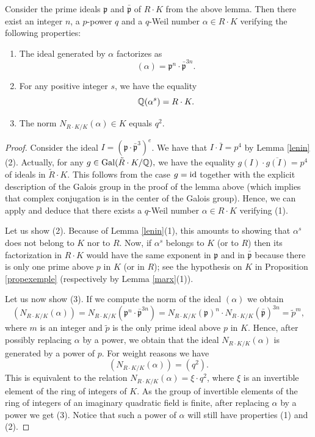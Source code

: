 \documentclass[11pt]{amsart}
\begin{document}
\begin{appendices}
\begin{lemma}\label{engels}
Consider the prime ideals $\mathfrak{p}$ and $\bar{\mathfrak{p}}$ of  $R\cdot K$ from the above lemma. Then there exist an integer $n$, a $p$-power $q$ and a $q$-Weil number $\alpha\in R\cdot K$ verifying the following properties:
\begin{enumerate}
 \item The ideal generated by $\alpha$ factorizes as
\[(\alpha)=\mathfrak{p}^n\cdot \bar{\mathfrak{p}}^{3n}.\]
\item For any positive integer $s$, we have the equality
\[\mathbb{Q}(\alpha^s)= R\cdot K.\]
\item The norm $N_{R\cdot K/K}(\alpha)\in K$ equals $q^2$.
\end{enumerate}
\end{lemma}
\begin{proof}
Consider the ideal $I=(\mathfrak{p}\cdot \bar{\mathfrak{p}}^{3})^e $. We have that $I \cdot \bar{I}= p^4$ by Lemma \ref{lenin}(2). Actually, for any $g\in\textnormal{Gal}(\tilde{R}\cdot K/\mathbb{Q}),$ we have the equality ${g(I) \cdot \overline{g(I)}= p^4}$ of ideals in $\tilde{R}\cdot K$. This follows from the case $g=\mathrm{id}$ together with the explicit description of the Galois group in the proof of the lemma above (which implies that complex conjugation is in the center of the Galois group). Hence, we can apply  \cite[Lemma 1]{Honda} and deduce that there exists a  $q$-Weil number $\alpha\in R\cdot K$ verifying (1).





Let us show (2). Because of Lemma \ref{lenin}(1), this amounts to showing that $\alpha^s$ does not belong to $K$ nor to $R$. Now, if  $\alpha^s$ belongs to $K$ (or to $R$) then its factorization in $R\cdot K$ would have the same exponent in $\mathfrak{p}$ and in $\bar{\mathfrak{p}}$ because there is only one prime above $p$ in $K$ (or in $R$); see the hypothesis on $K$ in Proposition \ref{propexemple} (respectively by Lemma \ref{marx}(1)).


Let us now show (3). If we compute the  norm of the ideal $(\alpha)$ we obtain
\[ (N_{R\cdot K/K} (\alpha))= N_{R\cdot K/K} (\mathfrak{p}^n\cdot \bar{\mathfrak{p}}^{3n}) = N_{R\cdot K/K} (\mathfrak{p})^n\cdot N_{R\cdot K/K} ( \bar{\mathfrak{p}})^{3n}= \tilde{p}^m,\]
where $m$ is an integer and $\tilde{p}$ is the only prime ideal above $p$ in $K$. Hence, after possibly replacing $\alpha$ by a power, we obtain that the ideal $N_{R\cdot K/K} (\alpha)$ is generated by a power of $p$. For weight reasons we have
\[(N_{R\cdot K/K} (\alpha)) = (q^2).\]
This is equivalent to the relation $N_{R\cdot K/K} (\alpha) = \xi \cdot q^2$, where $\xi$ is an invertible element of the ring of integers of $K$. As the group of  invertible elements of the ring of integers of an  imaginary quadratic field is finite, after replacing $\alpha$ by a power we get (3). Notice that such a power of $\alpha$ will still have properties (1) and (2).
\end{proof}


\end{appendices}
\end{document}
